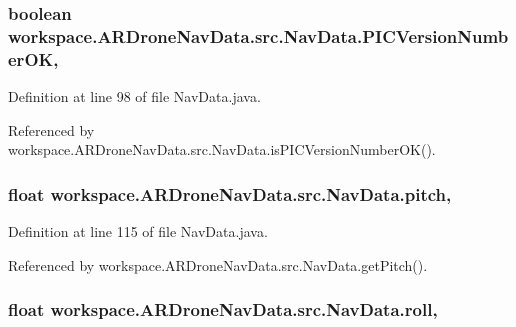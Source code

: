 \subsubsection[{P\+I\+C\+Version\+Number\+O\+K}]{\setlength{\rightskip}{0pt plus 5cm}boolean workspace.\+A\+R\+Drone\+Nav\+Data.\+src.\+Nav\+Data.\+P\+I\+C\+Version\+Number\+O\+K\hspace{0.3cm}{\ttfamily [static]}, {\ttfamily [protected]}}\label{classworkspace_1_1_a_r_drone_nav_data_1_1src_1_1_nav_data_a5bf0bf33423ffa637a82b9e6d96d2345}


Definition at line 98 of file Nav\+Data.\+java.



Referenced by workspace.\+A\+R\+Drone\+Nav\+Data.\+src.\+Nav\+Data.\+is\+P\+I\+C\+Version\+Number\+O\+K().

\hypertarget{classworkspace_1_1_a_r_drone_nav_data_1_1src_1_1_nav_data_acd608bde222fb79f3ecb1eabc0a2a68e}{}
\subsubsection[{pitch}]{\setlength{\rightskip}{0pt plus 5cm}float workspace.\+A\+R\+Drone\+Nav\+Data.\+src.\+Nav\+Data.\+pitch\hspace{0.3cm}{\ttfamily [static]}, {\ttfamily [protected]}}\label{classworkspace_1_1_a_r_drone_nav_data_1_1src_1_1_nav_data_acd608bde222fb79f3ecb1eabc0a2a68e}


Definition at line 115 of file Nav\+Data.\+java.



Referenced by workspace.\+A\+R\+Drone\+Nav\+Data.\+src.\+Nav\+Data.\+get\+Pitch().

\hypertarget{classworkspace_1_1_a_r_drone_nav_data_1_1src_1_1_nav_data_a390325d58f9221a7bf863a8df435d7fd}{}
\subsubsection[{roll}]{\setlength{\rightskip}{0pt plus 5cm}float workspace.\+A\+R\+Drone\+Nav\+Data.\+src.\+Nav\+Data.\+roll\hspace{0.3cm}{\ttfamily [static]}, {\ttfamily [protected]}}\label{classworkspace_1_1_a_r_drone_nav_data_1_1src_1_1_nav_data_a390325d58f9221a7bf863a8df435d7fd}


